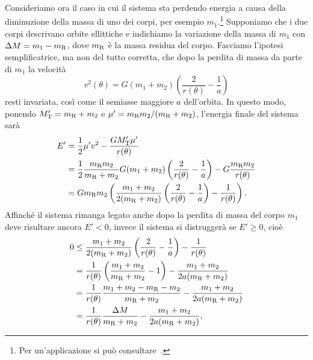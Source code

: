 {Consideriamo ora il caso in cui il sistema sta perdendo energia a causa della
diminuzione della massa di uno dei corpi, per esempio
$m_1$.\footnote{Per un'applicazione si può
  consultare~\cite[350]{padmanabhan:stars}.}
Supponiamo che i due corpi descrivano orbite ellittiche e indichiamo la
variazione della massa di $m_1$ con $\Delta M = m_1 - m_\textup{R}$, dove
$m_\textup{R}$ è la massa residua del corpo. Facciamo l'ipotesi semplificatrice,
ma non del tutto corretta, che dopo la perdita di massa da parte di $m_1$ la
velocità
\begin{equation}
  v^2(\theta) = G(m_1 + m_2)
  \left(
    \frac{2}{r(\theta)} - \frac{1}{a}
  \right)
\end{equation}
resti invariata, così come il semiasse maggiore $a$ dell'orbita. In questo modo,
ponendo $M'_\textup{T}=m_\textup{R}+m_2$ e $\mu' = m_\textup{R}m_2/(m_\textup{R}
+ m_2)$, l'energia finale del sistema sarà
\begin{equation}
  \begin{split}
    E' &= \frac{1}{2}\mu'v^2 - \frac{GM'_\textup{T}\mu'}{r(\theta)} \\
    &= \frac{1}{2}\frac{m_\textup{R}m_2}{m_\textup{R} + m_2}G(m_1 + m_2)
    \left(
      \frac{2}{r(\theta)} - \frac{1}{a}
    \right) - G\frac{m_\textup{R}m_2}{r(\theta)} \\
    &= Gm_\textup{R}m_2
    \left(
      \frac{m_1 + m_2}{2(m_\textup{R} + m_2)}
      \left(
        \frac{2}{r(\theta)} - \frac{1}{a}
      \right) - \frac{1}{r(\theta)}
    \right).
  \end{split}
\end{equation}
Affinché il sistema rimanga legato anche dopo la perdita di massa del corpo
$m_1$ deve risultare ancora $E' < 0$, invece il sistema si distruggerà se $E'
\geq 0$, cioè
\begin{equation}
  \begin{split}
    0 &\leq \frac{m_1 + m_2}{2(m_\textup{R} + m_2)}
    \left(
      \frac{2}{r(\theta)} - \frac{1}{a}
    \right) - \frac{1}{r(\theta)} \\
    &= \frac{1}{r(\theta)}
    \left(
      \frac{m_1 + m_2}{m_\textup{R} + m_2} - 1
    \right) - \frac{m_1 + m_2}{2a(m_\textup{R} + m_2)} \\
    &= \frac{1}{r(\theta)}\frac{m_1 + m_2 - m_\textup{R} - m_2}{m_\textup{R} +
      m_2} - \frac{m_1 + m_2}{2a(m_\textup{R} + m_2)} \\
    &= \frac{1}{r(\theta)}\frac{\Delta M}{m_\textup{R} +
      m_2} - \frac{m_1 + m_2}{2a(m_\textup{R} + m_2)},

\end{split}
\end{equation}}
